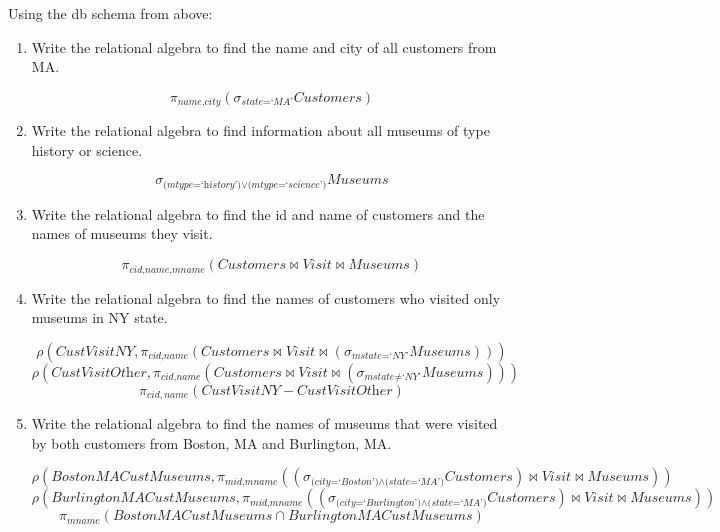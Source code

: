 \documentclass[letterpaper, 11pt]{article}
\begin{document}
Using the db schema from above:
\begin{enumerate}[leftmargin=*]
    \item Write the relational algebra to find the name and city of all customers from MA.
    \begin{tcolorbox}
    \[\pi_{\textit{name,city}}\left(\sigma_{\textit{state=`MA'}}\textit{Customers}\right)\]
    \end{tcolorbox}
    \item Write the relational algebra to find information about all museums of type history or science.
    \begin{tcolorbox}
    \[\sigma_{\textit{(mtype=`history')} \vee \textit{(mtype=`science')}}\textit{Museums}\]
    \end{tcolorbox}
    \item Write the relational algebra to find the id and name of customers and the names of museums they visit.
    \begin{tcolorbox}
    \[\pi_{\textit{cid,name,mname}}\left(\textit{Customers} \bowtie \textit{Visit} \bowtie \textit{Museums}\right)\]    
    \end{tcolorbox}
    \item Write the relational algebra to find the names of customers who visited only museums in NY state.
    \begin{tcolorbox}
    \[\rho\left(\textit{CustVisitNY}, \pi_{\textit{cid,name}}\left(\textit{Customers} \bowtie \textit{Visit} \bowtie \left(\sigma_{\textit{mstate=`NY'}} \textit{Museums}\right)\right)\right)\]
    \[\rho\left(\textit{CustVisitOther}, \pi_{\textit{cid,name}}\left(\textit{Customers} \bowtie \textit{Visit} \bowtie \left(\sigma_{\textit{mstate}\neq\textit{`NY'}} \textit{Museums}\right)\right)\right)\]
    \[\pi_{cid,name}\left(\textit{CustVisitNY} - \textit{CustVisitOther}\right)\]
    \end{tcolorbox}
    \item Write the relational algebra to find the names of museums that were visited by both customers from Boston, MA and Burlington, MA.
    \begin{tcolorbox}
    \[\rho\left(\textit{BostonMACustMuseums}, \pi_{\textit{mid,mname}}\left(\left(\sigma_{\textit{(city=`Boston')} \wedge \textit{(state=`MA')}} \textit{Customers}\right) \bowtie \textit{Visit} \bowtie \textit{Museums}\right)\right)\]
    \[\rho\left(\textit{BurlingtonMACustMuseums}, \pi_{\textit{mid,mname}}\left(\left(\sigma_{\textit{(city=`Burlington')} \wedge \textit{(state=`MA')}} \textit{Customers}\right) \bowtie \textit{Visit} \bowtie \textit{Museums}\right)\right)\]
    \[\pi_{\textit{mname}}\left(\textit{BostonMACustMuseums} \cap \textit{BurlingtonMACustMuseums}\right)\]    
    \end{tcolorbox}
\end{enumerate}
\end{document}
